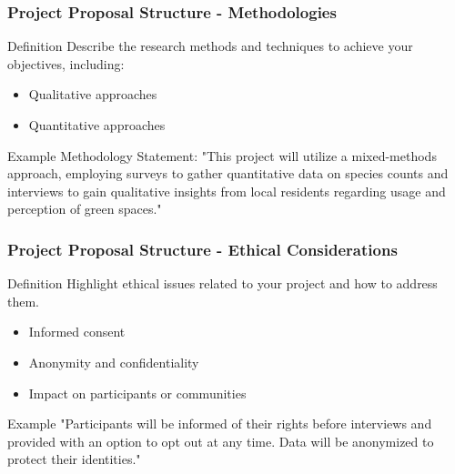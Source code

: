 \documentclass[aspectratio=169]{beamer}
\begin{document}
\begin{frame}[fragile]
    \frametitle{Project Proposal Structure - Methodologies}
    \begin{block}{Definition}
        Describe the research methods and techniques to achieve your objectives, including:
        \begin{itemize}
            \item Qualitative approaches
            \item Quantitative approaches
        \end{itemize}
    \end{block}
    
    \begin{block}{Example}
        Methodology Statement: 
        "This project will utilize a mixed-methods approach, employing surveys to gather quantitative data
        on species counts and interviews to gain qualitative insights from local residents regarding usage
        and perception of green spaces."
    \end{block}
\end{frame}

\begin{frame}[fragile]
    \frametitle{Project Proposal Structure - Ethical Considerations}
    \begin{block}{Definition}
        Highlight ethical issues related to your project and how to address them. 
    \end{block}
    \begin{itemize}
        \item Informed consent
        \item Anonymity and confidentiality
        \item Impact on participants or communities
    \end{itemize}
    
    \begin{block}{Example}
        "Participants will be informed of their rights before interviews and provided with an option to 
        opt out at any time. Data will be anonymized to protect their identities."
    \end{block}
\end{frame}
\end{document}
